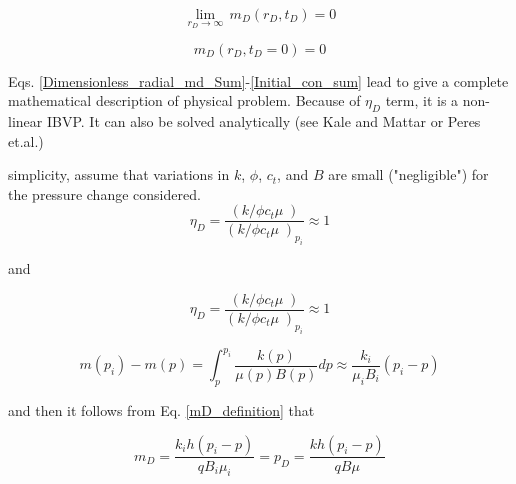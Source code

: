 \documentclass{llncs}
\numberwithin{equation}{section}
\numberwithin{figure}{section}
\numberwithin{table}{section}
\begin{document}
    \begin{equation}
        \underset{{{r}_{D}}\to \infty }{\mathop{\lim }}\,{{m}_{D}}\left( {{r}_{D}},{{t}_{D}} \right)=0
        \label{Boundary_2_sum}
    \end{equation}    
    
    \begin{equation}
        {{m}_{D}}\left( {{r}_{D}},{{t}_{D}}=0 \right)=0
        \label{Initial_con_sum}
    \end{equation}       
    
    Eqs. \ref{Dimensionless_radial_md_Sum}-\ref{Initial_con_sum} lead to give a complete mathematical description of  physical problem. Because of ${{\eta }_{D}}$ term, it is a non-linear IBVP. It can also be solved analytically (see Kale and Mattar\cite{Kale_1980_1} or Peres et.al.\cite{Peres_1990_1})
    
     simplicity, assume that variations in $k$, $\phi$, $c_{t}$, and $B$ are small ("negligible") for the pressure change considered. 
     \begin{equation}
        {{\eta }_{D}}=\frac{\left( {k}/{\phi {{c}_{t}}\mu }\; \right)}{{{\left( {k}/{\phi {{c}_{t}}\mu }\; \right)}_{{{p}_{i}}}}}\approx 1
        \label{assumption}
    \end{equation}     
    
    and
    
    \begin{equation}
        {{\eta }_{D}}=\frac{\left( {k}/{\phi {{c}_{t}}\mu }\; \right)}{{{\left( {k}/{\phi {{c}_{t}}\mu }\; \right)}_{{{p}_{i}}}}}\approx 1
        \label{assumption}
    \end{equation}        
    
    \begin{equation}
        m\left( {{p}_{i}} \right)-m\left( p \right)=\int_{p}^{{{p}_{i}}}{\frac{k\left( p \right)}{\mu \left( p \right)B\left( p \right)}dp\approx \frac{{{k}_{i}}}{{{\mu }_{i}}{{B}_{i}}}}\left( {{p}_{i}}-p \right)
        \label{assumption_2}
    \end{equation}     
    
    and then it follows from Eq. \ref{mD_definition} that
    
    \begin{equation}
        {{m}_{D}}=\frac{{{k}_{i}}h\left( {{p}_{i}}-p \right)}{q{{B}_{i}}{{\mu }_{i}}}={{p}_{D}}=\frac{kh\left( {{p}_{i}}-p \right)}{qB\mu }
        \label{mD_to_pD}
    \end{equation}     
    
\end{document}
